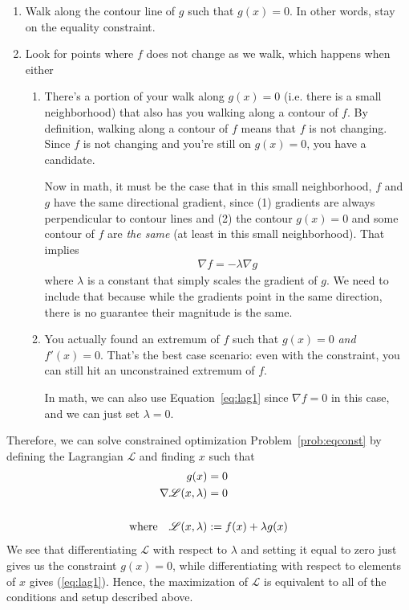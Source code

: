 \documentclass[12pt]{article}
\numberwithin{equation}{section} %
\theoremstyle{plain}
\theoremstyle{definition}
\theoremstyle{remark}
\begin{document}
\begin{enumerate}
  \item Walk along the contour line of $g$ such that $g(x)=0$. In other
    words, stay on the equality constraint.
  \item Look for points where $f$ does not change as we walk, which
    happens when either
    \begin{enumerate}
      \item There's a portion of your walk along $g(x)=0$ (i.e. there is
        a small neighborhood) that also has you walking along a contour
        of $f$. By definition, walking along a contour of $f$ means that
        $f$ is not changing. Since $f$ is not changing and you're still
        on $g(x)=0$, you have a candidate.

        Now in math, it must be the case that in this small
        neighborhood, $f$ and $g$ have the same directional gradient,
        since (1) gradients are always perpendicular to contour lines
        and (2) the contour $g(x)=0$ and some contour of $f$ are
        \emph{the same} (at least in this small neighborhood). That
        implies
        \begin{align}
          \nabla f = -\lambda \nabla g
          \label{eq:lag1}
        \end{align}
        where $\lambda$ is a constant that simply scales the gradient of
        $g$. We need to include that because while the gradients point
        in the same direction, there is no guarantee their magnitude is
        the same.

      \item You actually found an extremum of $f$ such that $g(x)=0$
        \emph{and} $f'(x)=0$. That's the best case scenario: even with
        the constraint, you can still hit an unconstrained extremum of
        $f$.

        In math, we can also use Equation~\ref{eq:lag1} since
        $\nabla f=0$ in this case, and we can just set $\lambda=0$.
    \end{enumerate}
  \end{enumerate}
Therefore, we can solve constrained optimization
Problem~\ref{prob:eqconst} by defining the Lagrangian $\mathscr{L}$
and finding $x$ such that
\begin{align}
  g(x) &= 0\label{lagrangeSingle}\\
  \nabla \mathscr{L}(x,\lambda) &= 0 \notag\\\notag\\
  \text{where} \quad
  \mathscr{L}(x,\lambda) &:= f(x) + \lambda g(x) \notag
\end{align}
We see that differentiating $\mathscr{L}$ with respect to $\lambda$ and
setting it equal to zero just gives us the constraint $g(x)=0$, while
differentiating with respect to elements of $x$ gives (\ref{eq:lag1}).
Hence, the maximization of $\mathscr{L}$ is equivalent to all of the
conditions and setup described above.
\end{document}
